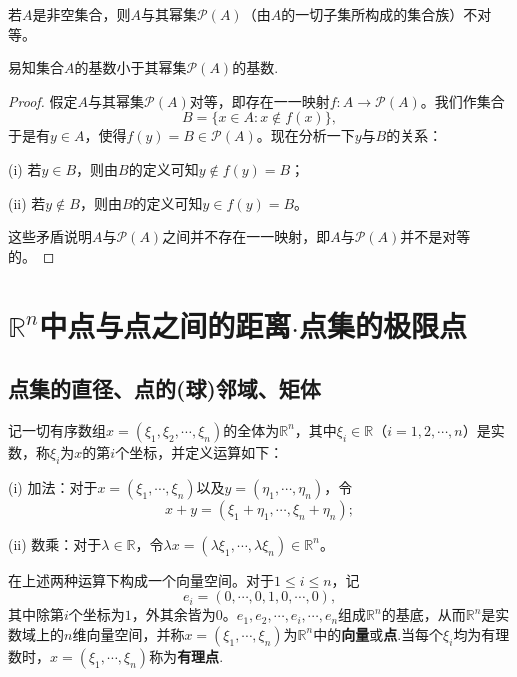 \documentclass[lang=cn,newtx,10pt,scheme=chinese]{../Template/elegantbook}
\begin{document}
\begin{theorem}[无最大基数定理]\label{theorem:无最大基数定理}
若\(A\)是非空集合，则\(A\)与其幂集\(\mathcal{P}(A)\)（由\(A\)的一切子集所构成的集合族）不对等。
\end{theorem}
\begin{note}
  易知集合\(A\)的基数小于其幂集\(\mathcal{P}(A)\)的基数.
\end{note}
\begin{proof}
  假定\(A\)与其幂集\(\mathcal{P}(A)\)对等，即存在一一映射\(f:A\rightarrow\mathcal{P}(A)\)。我们作集合
\[B = \{x\in A:x\notin f(x)\},\]
于是有\(y\in A\)，使得\(f(y)=B\in\mathcal{P}(A)\)。现在分析一下\(y\)与\(B\)的关系：

(i) 若\(y\in B\)，则由\(B\)的定义可知\(y\notin f(y)=B\)；

(ii) 若\(y\notin B\)，则由\(B\)的定义可知\(y\in f(y)=B\)。

这些矛盾说明\(A\)与\(\mathcal{P}(A)\)之间并不存在一一映射，即\(A\)与\(\mathcal{P}(A)\)并不是对等的。

\end{proof}


\section{$\mathbb{R}^n$中点与点之间的距离$\cdot$点集的极限点}

\subsection{点集的直径、点的(球)邻域、矩体}

\begin{definition}\label{definition:Rn与Rn中的运算}
  记一切有序数组\(x = (\xi_1,\xi_2,\cdots,\xi_n)\)的全体为\(\mathbb{R}^n\)，其中\(\xi_i\in\mathbb{R}\)（\(i = 1,2,\cdots,n\)）是实数，称\(\xi_i\)为\(x\)的第\(i\)个坐标，并定义运算如下：

(i) 加法：对于\(x = (\xi_1,\cdots,\xi_n)\)以及\(y = (\eta_1,\cdots,\eta_n)\)，令
\[x + y = (\xi_1+\eta_1,\cdots,\xi_n+\eta_n);\]

(ii) 数乘：对于\(\lambda\in\mathbb{R}\)，令\(\lambda x = (\lambda\xi_1,\cdots,\lambda\xi_n)\in\mathbb{R}^n\)。

在上述两种运算下构成一个向量空间。对于\(1\leqslant i\leqslant n\)，记
\[e_i = (0,\cdots,0,1,0,\cdots,0),\]
其中除第\(i\)个坐标为\(1\)，外其余皆为\(0\)。\(e_1,e_2,\cdots,e_i,\cdots,e_n\)组成\(\mathbb{R}^n\)的基底，从而\(\mathbb{R}^n\)是实数域上的\(n\)维向量空间，并称\(x = (\xi_1,\cdots,\xi_n)\)为\(\mathbb{R}^n\)中的\textbf{向量}或\textbf{点}.当每个\(\xi_i\)均为有理数时，\(x = (\xi_1,\cdots,\xi_n)\)称为\textbf{有理点}.
\end{definition}
\end{document}
